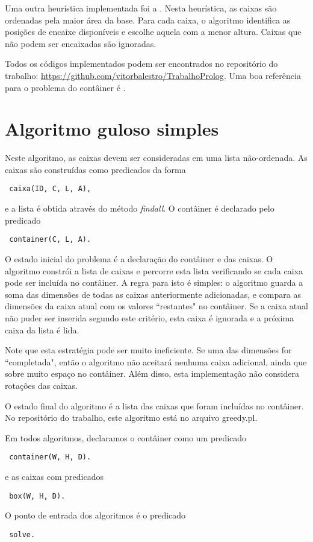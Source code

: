 \documentclass[12pt]{article}
\begin{document}
Uma outra heurística implementada foi a . Nesta heurística, as caixas são ordenadas pela maior área da base. Para cada caixa, o algoritmo identifica as posições de encaixe disponíveis e escolhe aquela com a menor altura. Caixas que não podem ser encaixadas são ignoradas.

Todos os códigos implementados podem ser encontrados no repositório do trabalho: \url{https://github.com/vitorbalestro/TrabalhoProlog}. Uma boa referência para o problema do contâiner é \cite{ngoi}.

\section{Algoritmo guloso simples}

Neste algoritmo, as caixas devem ser consideradas em uma lista não-ordenada. As caixas são construídas como predicados da forma
\begin{verbatim} caixa(ID, C, L, A),
\end{verbatim}
e a lista é obtida através do método \emph{findall}. O contâiner é declarado pelo predicado
\begin{verbatim} container(C, L, A).
\end{verbatim}

O estado inicial do problema é a declaração do contâiner e das caixas. O algoritmo constrói a lista de caixas e percorre esta lista verificando se cada caixa pode ser incluída no contâiner. A regra para isto é simples: o algoritmo guarda a soma das dimensões de todas as caixas anteriormente adicionadas, e compara as dimensões da caixa atual com os valores ``restantes" no contâiner. Se a caixa atual não puder ser inserida segundo este critério, esta caixa é ignorada e a próxima caixa da lista é lida.

Note que esta estratégia pode ser muito ineficiente. Se uma das dimensões for ``completada", então o algoritmo não aceitará nenhuma caixa adicional, ainda que sobre muito espaço no contâiner. Além disso, esta implementação não considera rotações das caixas.

O estado final do algoritmo é a lista das caixas que foram incluídas no contâiner. No repositório do trabalho, este algoritmo está no arquivo greedy.pl.

Em todos algoritmos, declaramos o contâiner como um predicado
\begin{verbatim} container(W, H, D).
\end{verbatim}
e as caixas com predicados
\begin{verbatim} box(W, H, D).
\end{verbatim}
O ponto de entrada dos algoritmos é o predicado
\begin{verbatim} solve.
\end{verbatim}
\end{document}
